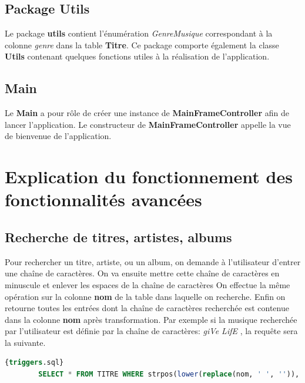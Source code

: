 \documentclass[a4paper,12pt, french]{report}
\begin{document}
		\subsection{Package Utils}
		Le package \textbf{utils} contient l'énumération \emph{GenreMusique} correspondant à la colonne \emph{genre} dans la table \textbf{Titre}. Ce package comporte également la classe \textbf{Utils} contenant quelques fonctions utiles à la réalisation de l'application.
		\subsection{Main}
		Le \textbf{Main} a pour rôle de créer une instance de \textbf{MainFrameController} afin de lancer l'application. Le constructeur de \textbf{MainFrameController} appelle la vue de bienvenue de l'application.
	\section{Explication du fonctionnement des fonctionnalités avancées}
		\subsection{Recherche de titres, artistes, albums}
		Pour rechercher un titre, artiste, ou un album, on demande à l'utilisateur d'entrer une chaîne de caractères. On va ensuite mettre cette chaîne de caractères en minuscule et enlever les espaces de la chaîne de caractères On effectue la même opération sur la colonne \textbf{nom} de la table dans laquelle on recherche. Enfin on retourne toutes les entrées dont la chaîne de caractères recherchée est contenue dans la colonne \textbf{nom} après \textgravedbl transformation\textacutedbl. Par exemple si la musique recherchée par l'utilisateur est définie par la chaîne de caractères: \emph{giVe LifE   }, la requête sera la suivante.
		\begin{lstlisting}[language=SQL, label=rechercher,caption=Exemple de requête de recherche , breaklines, frame=single]{triggers.sql}
		SELECT * FROM TITRE WHERE strpos(lower(replace(nom, ' ', '')), 'givelife') > 0;
		\end{lstlisting}
\end{document}
